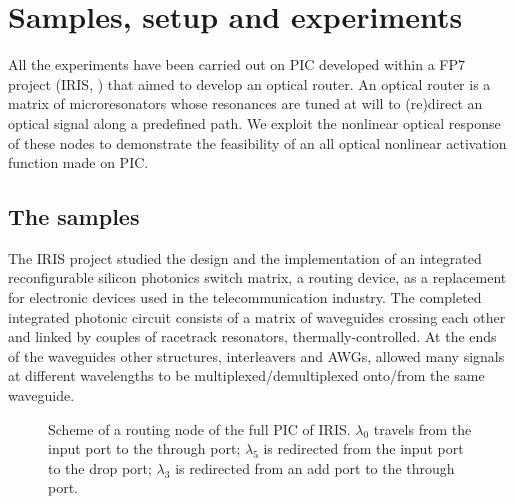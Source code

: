 \chapter{Samples, setup and experiments}
\label{ch:experiments}

All the experiments have been carried out on \acs{PIC} developed within a FP7 project (IRIS, \cite{testa2016design}) that aimed to develop an optical router.
An optical router is a matrix of microresonators whose resonances are tuned at will to (re)direct an optical signal along a predefined path.
We exploit the nonlinear optical response of these nodes to demonstrate the feasibility of an all optical nonlinear activation function made on PIC.


\section{The samples}
The IRIS project studied the design and the implementation of an integrated reconfigurable silicon photonics switch matrix, a routing device, as a replacement for electronic devices used in the telecommunication industry.
The completed integrated photonic circuit consists of a matrix of waveguides crossing each other and linked by couples of racetrack resonators, thermally-controlled.
At the ends of the waveguides other structures, interleavers and \acsp{AWG}, allowed many signals at different wavelengths to be multiplexed/demultiplexed onto/from the same waveguide.

\begin{figure}[hbtp]
	\centering
	
	\caption{Scheme of a routing node of the full \acs{PIC} of IRIS. $\lambda_0$ travels from the input port to the through port; $\lambda_5$ is redirected from the input port to the drop port; $\lambda_3$ is redirected from an add port to the through port.}
	\label{fig:fullmatrix}
\end{figure}

